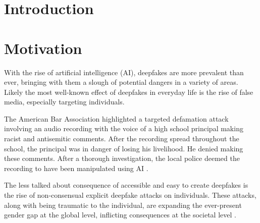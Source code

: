 \documentclass[sigconf,authordraft]{acmart}
\begin{document}



\maketitle

\section{Introduction}

\section{Motivation}

With the rise of artificial intelligence (AI), deepfakes are more prevalent than ever, bringing with them a slough of potential dangers in a variety of areas. Likely the most well-known effect of deepfakes in everyday life is the rise of false media, especially targeting individuals. 

The American Bar Association highlighted a targeted defamation attack involving an audio recording with the voice of a high school principal making racist and antisemitic comments. After the recording spread throughout the school, the principal was in danger of losing his livelihood. He denied making these comments. After a thorough investigation, the local police deemed the recording to have been manipulated using AI \cite{b5}. 

The less talked about consequence of accessible and easy to create deepfakes is the rise of non-consensual explicit deepfake attacks on individuals. These attacks, along with being traumatic to the individual, are expanding the ever-present gender gap at the global level, inflicting consequences at the societal level \cite{b3}.
\end{document}
